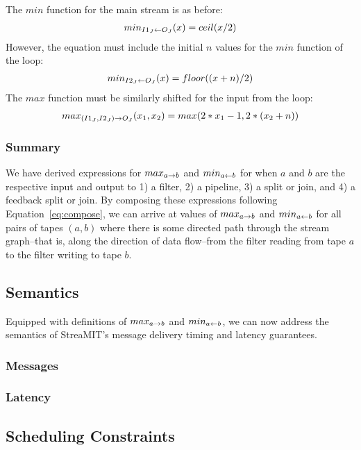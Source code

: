 The $min$ function for the main stream is
as before:
\begin{eqnarray*}
min_{I1_J \leftarrow O_J}(x) = ceil(x/2) \\
\end{eqnarray*}
However, the equation must include the initial $n$ values for the
$min$ function of the loop:
\begin{eqnarray*}
min_{I2_J \leftarrow O_J}(x) = floor((x+n)/2) 
\end{eqnarray*}
The $max$ function must be similarly shifted for the input from the loop:
\begin{eqnarray*}
max_{(I1_J, I2_J) \rightarrow O_J}(x_1, x_2) = max(2*x_1-1, 2*(x_2+n))
\end{eqnarray*}

\subsubsection{Summary}

We have derived expressions for $max_{a \rightarrow b}$ and $min_{a \leftarrow b}$ for when
$a$ and $b$ are the respective input and output to 1) a filter, 2) a
pipeline, 3) a split or join, and 4) a feedback split or join.  By
composing these expressions following Equation~\ref{eq:compose}, we
can arrive at values of $max_{a \rightarrow b}$ and $min_{a \leftarrow b}$ for all pairs of
tapes $(a, b)$ where there is some directed path through the stream
graph--that is, along the direction of data flow--from the filter
reading from tape $a$ to the filter writing to tape $b$.

\subsection{Semantics}

Equipped with definitions of $max_{a \rightarrow b}$ and $min_{a \leftarrow b}$, we can now
address the semantics of StreaMIT's message delivery timing and
latency guarantees. 

\subsubsection{Messages}



\subsubsection{Latency}

\subsection{Scheduling Constraints}

